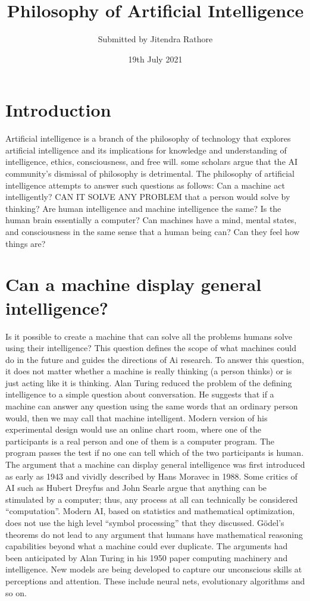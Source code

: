 \documentclass{article}
\title{Philosophy of Artificial Intelligence}
\author{Submitted by Jitendra Rathore}
\date{19th July 2021}
\begin{document}
\maketitle

\section{Introduction}
Artificial intelligence is a branch of the philosophy of technology that explores artificial intelligence and its implications for knowledge and understanding of intelligence, ethics, consciousness, and free will. some scholars argue that the AI community’s dismissal of philosophy is detrimental. The philosophy of artificial intelligence attempts to answer such questions as follows: Can a machine act intelligently? CAN IT SOLVE ANY PROBLEM that a person would solve by thinking? Are human intelligence and machine intelligence the same?
Is the human brain essentially a computer? Can machines have a mind, mental states, and consciousness in the same sense that a human being can? Can they feel how things are?
\section{Can a machine display general intelligence? }
Is it possible to create a machine that can solve all the problems humans solve using their intelligence? This question defines the scope of what machines could do in the future and guides the directions of Ai research. To answer this question, it does not matter whether a machine is really thinking (a person thinks) or is just acting like it is thinking.
Alan Turing reduced the problem of the defining intelligence to a simple question about conversation. He suggests that if a machine can answer any question using the same words that an ordinary person would, then we may call that machine intelligent. Modern version of his experimental design would use an online chart room, where one of the participants is a real person and one of them is a computer program. The program passes the test if no one can tell which of the two participants is human.
The argument that a machine can display general intelligence was first introduced as early as 1943 and vividly described by Hans Moravec in 1988. Some critics of AI such as Hubert Dreyfus and John Searle argue that anything can be stimulated by a computer; thus, any process at all can technically be considered “computation”.
Modern AI, based on statistics and mathematical optimization, does not use the high level “symbol processing” that they discussed. Gödel’s theorems do not lead to any argument that humans have mathematical reasoning capabilities beyond what a machine could ever duplicate. The arguments had been anticipated by Alan Turing in his 1950 paper computing machinery and intelligence. New models are being developed to capture our unconscious skills at perceptions and attention. These include neural nets, evolutionary algorithms and so on.
\end{document}
